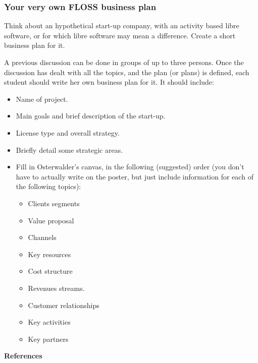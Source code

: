 \documentclass[a4paper]{article}
\begin{document}
\subsubsection{Your very own FLOSS business plan}
\label{sub:business-plan}

Think about an hypothetical start-up company, with an activity based libre software, or for which libre software may mean a difference. Create a short business plan for it.

A previous discussion can be done in groups of up to three persons. Once the discussion has dealt with all the topics, and the plan (or plans) is defined, each student should write her own business plan for it. It should include:

\begin{itemize}
\item Name of project.
\item Main goals and brief description of the start-up.
\item License type and overall strategy.
\item Briefly detail some strategic areas.
\item Fill in Osterwalder's canvas, in the following (suggested) order (you don't have to actually write on the poster, but just include information for each of the following topics):
  \begin{itemize}
  \item Clients segments
  \item Value proposal
  \item Channels
  \item Key resources
  \item Cost structure
  \item Revenues streams.
  \item Customer relationships
  \item Key activities
  \item Key partners
  \end{itemize}
\end{itemize}

\textbf{References}
\end{document}
